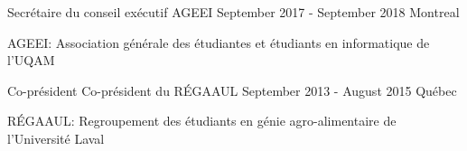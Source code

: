 

\begin{cventries}

  \cventry
    {Secrétaire du conseil exécutif}%
    {{AGEEI}}%
    {September 2017 - September 2018} %
    {Montreal} %
    {
      \begin{cvitems} %
        \item {AGEEI: Association générale des étudiantes et étudiants
               en informatique de l'UQAM}
      \end{cvitems}
    }

  \cventry
    {Co-président} %
    {Co-président du RÉGAAUL} %
    {September 2013 - August 2015} %
    {Québec} %
    {
      \begin{cvitems} %
        \item {RÉGAAUL: Regroupement des étudiants en génie agro-alimentaire de
               l'Université Laval}
      \end{cvitems}
    }

\end{cventries}
